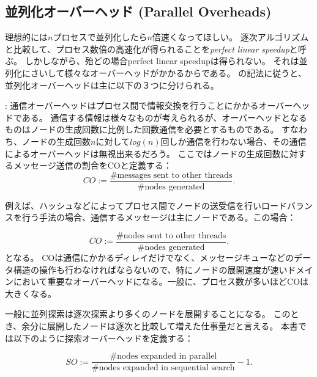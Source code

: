 \documentclass[10pt]{book}
\begin{document}
\subsection{並列化オーバーヘッド (Parallel Overheads)}
\label{sec:parallel-overheads}

理想的には$n$プロセスで並列化したら$n$倍速くなってほしい。
逐次アルゴリズムと比較して、プロセス数倍の高速化が得られることを{\it perfect linear speedup}と呼ぶ。
しかしながら、殆どの場合perfect linear speedupは得られない。
それは並列化にさいして様々なオーバーヘッドがかかるからである。
\cite{jinnai2017work}の記法に従うと、並列化オーバーヘッドは主に以下の３つに分けられる。

:
通信オーバーヘッドはプロセス間で情報交換を行うことにかかるオーバーヘッドである。
通信する情報は様々なものが考えられるが、オーバーヘッドとなるものはノードの生成回数に比例した回数通信を必要とするものである。
すなわち、ノードの生成回数$n$に対して$log(n)$回しか通信を行わない場合、その通信によるオーバーヘッドは無視出来るだろう。
ここではノードの生成回数に対するメッセージ送信の割合をCOと定義する：
\begin{equation}
	CO := \frac{\text{\# messages sent to other threads}}{\text{\# nodes generated}}.
\end{equation}

例えば、ハッシュなどによってプロセス間でノードの送受信を行いロードバランスを行う手法の場合、通信するメッセージは主にノードである。この場合：

\begin{equation}
	CO := \frac{\text{\# nodes sent to other threads}}{\text{\# nodes generated}}.
\end{equation}
となる。
COは通信にかかるディレイだけでなく、メッセージキューなどのデータ構造の操作も行わなければならないので、特にノードの展開速度が速いドメインにおいて重要なオーバーヘッドになる。一般に、プロセス数が多いほどCOは大きくなる。


一般に並列探索は逐次探索より多くのノードを展開することになる。
このとき、余分に展開したノードは逐次と比較して増えた仕事量だと言える。
本書では以下のように探索オーバーヘッドを定義する：

\begin{equation}
SO := \frac{\text{\# nodes expanded in parallel}}{\text{\#nodes expanded in sequential search}} - 1.
\end{equation}
\end{document}
